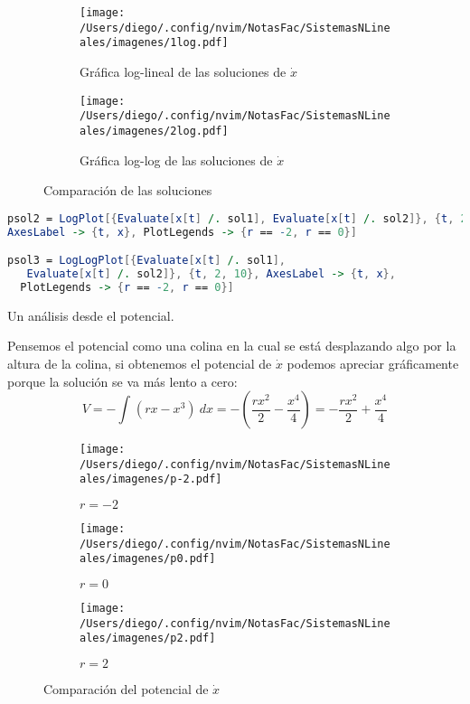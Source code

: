 \documentclass[12pt,letterpaper]{article}
\begin{document}
\begin{enumerate}
    \begin{figure}[H]
      \begin{subfigure}[b]{0.4\textwidth}
        \texttt{[image: /Users/diego/.config/nvim/NotasFac/SistemasNLineales/imagenes/1log.pdf]}
        \caption{Gráfica log-lineal de las soluciones de $\dot{x}$}
      \end{subfigure}
      \hfill
      \begin{subfigure}[b]{0.4\textwidth}
        \texttt{[image: /Users/diego/.config/nvim/NotasFac/SistemasNLineales/imagenes/2log.pdf]}
        \caption{Gráfica log-log de las soluciones de $\dot{x}$}
      \end{subfigure}
      \caption{Comparación de las soluciones}
    \end{figure}

    \begin{tcolorbox}[colback=Orange!10, colframe=Orange, title=Código figura 3]
    \begin{lstlisting}[language=Mathematica]
psol2 = LogPlot[{Evaluate[x[t] /. sol1], Evaluate[x[t] /. sol2]}, {t, 2, 10},
AxesLabel -> {t, x}, PlotLegends -> {r == -2, r == 0}]

psol3 = LogLogPlot[{Evaluate[x[t] /. sol1], 
   Evaluate[x[t] /. sol2]}, {t, 2, 10}, AxesLabel -> {t, x}, 
  PlotLegends -> {r == -2, r == 0}]
    \end{lstlisting}  
    \end{tcolorbox}

    Un análisis desde el potencial. 
    
    Pensemos el potencial como una colina en la cual se está desplazando algo por la altura de la colina, si obtenemos el potencial de $ \dot{x}$ podemos apreciar gráficamente porque la solución se va más lento a cero:
    $$
    V=-\int_{{}}^{{}} {(rx-x^3)} \: d{x} = -\left( \frac{rx^2}{2}-\frac{x^{4}}{4} \right) = -\frac{rx^2}{2}+\frac{x^{4}}{4}
    $$
    \begin{figure}[H]
      \begin{subfigure}[b]{0.3\textwidth}
        \texttt{[image: /Users/diego/.config/nvim/NotasFac/SistemasNLineales/imagenes/p-2.pdf]}
        \caption{$r=-2$}
      \end{subfigure}
      \hfill
      \begin{subfigure}[b]{0.3\textwidth}
        \texttt{[image: /Users/diego/.config/nvim/NotasFac/SistemasNLineales/imagenes/p0.pdf]}
        \caption{$r=0$}
      \end{subfigure}
       \begin{subfigure}[b]{0.3\textwidth}
        \texttt{[image: /Users/diego/.config/nvim/NotasFac/SistemasNLineales/imagenes/p2.pdf]}
        \caption{$r=2$}
      \end{subfigure}  
      \caption{Comparación del potencial de $\dot{x}$}
    \end{figure}


\end{enumerate}
\end{document}
